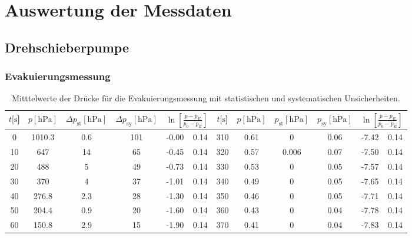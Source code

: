 \section{Auswertung der Messdaten}
\label{sec:Auswertung}
\subsection{Drehschieberpumpe}
\subsubsection{Evakuierungsmessung}
\begin{table}[H]
    \centering
      \caption{Mitttelwerte der Drücke für die Evakuierungsmessung mit statistischen und systematischen Unsicherheiten.}
      \label{tab:Dreh_Evak}
      \begin{tabular}{
        S[table-format=3.0] S[table-format=3.2] S[table-format=1.3] S[table-format=3.2] S @{${}\pm{}$} S | 
        S[table-format=3.0] S[table-format=3.2] S[table-format=1.3] S[table-format=1.3] S @{${}\pm{}$} S
        }
        \toprule
        {$t [\si{\second}$]} & 
        {$p [\si{\hecto\pascal}]$} & 
        {$\Delta p_\text{st} [\si{\hecto\pascal}]$} & 
        {$\Delta p_\text{sy} [\si{\hecto\pascal}]$} & 
         &
        {$t [\si{\second}$]} & 
        {$p [\si{\hecto\pascal}]$} & 
        {$p_\text{st} [\si{\hecto\pascal}]$} & 
        {$p_\text{sy} [\si{\hecto\pascal}]$} &
         \\
           & 1010.3 & 0.6  & 101     & -0.00 & 0.14 &   310 & 0.61   & 0       & 0.06  & -7.42 & 0.14\\
        10  & 647    & 14   & 65      & -0.45 & 0.14 &   320 & 0.57   & 0.006   & 0.07  & -7.50 & 0.14\\
        20  & 488    & 5    & 49      & -0.73 & 0.14 &   330 & 0.53   & 0       & 0.05  & -7.57 & 0.14\\
        30  & 370    & 4    & 37      & -1.01 & 0.14 &   340 & 0.49   & 0       & 0.05  & -7.65 & 0.14\\
        40  & 276.8  & 2.3  & 28      & -1.30 & 0.14 &   350 & 0.46   & 0       & 0.05  & -7.71 & 0.14\\
        50  & 204.4  & 0.9  & 20      & -1.60 & 0.14 &   360 & 0.43   & 0       & 0.04  & -7.78 & 0.14\\
        60  & 150.8  & 2.9  & 15      & -1.90 & 0.14 &   370 & 0.41   & 0       & 0.04  & -7.83 & 0.14\\

\end{tabular}
\end{table}
